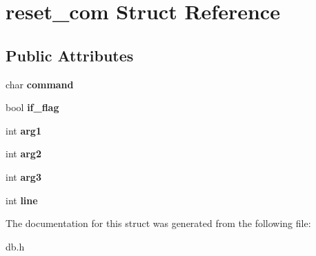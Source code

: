 \hypertarget{structreset__com}{}\section{reset\+\_\+com Struct Reference}
\label{structreset__com}
\subsection*{Public Attributes}
\begin{DoxyCompactItemize}
\item 
\mbox{\label{structreset__com_a6cca09d17ef8ba4765b1bddfe1cb6e31}} 
char {\bfseries command}
\item 
\mbox{\label{structreset__com_a255ba6742e464970df5f61fc9b8ccdf2}} 
bool {\bfseries if\+\_\+flag}
\item 
\mbox{\label{structreset__com_a635a6d7d405f9fda34d53803b48cc652}} 
int {\bfseries arg1}
\item 
\mbox{\label{structreset__com_a413552875fa3046ab670a408918494e1}} 
int {\bfseries arg2}
\item 
\mbox{\label{structreset__com_abe997d85fe29ad69fced2bd95be362f7}} 
int {\bfseries arg3}
\item 
\mbox{\label{structreset__com_a972c6717390cd5c0a25c04dee95064ac}} 
int {\bfseries line}
\end{DoxyCompactItemize}


The documentation for this struct was generated from the following file\+:\begin{DoxyCompactItemize}
\item 
db.\+h\end{DoxyCompactItemize}
